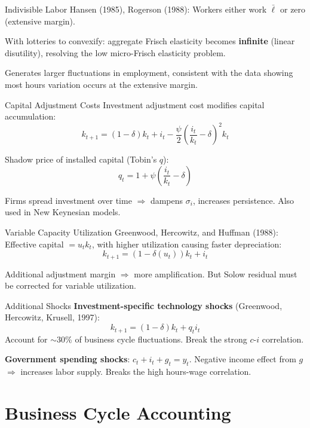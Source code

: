 \documentclass[blue]{beamer}
\begin{document}
\begin{frame}{Indivisible Labor}
	Hansen (1985), Rogerson (1988): Workers either work $\bar{\ell}$ or zero (extensive margin).
	
	\bigskip
	With lotteries to convexify: aggregate Frisch elasticity becomes \textbf{infinite} (linear disutility), resolving the low micro-Frisch elasticity problem.
	
	\bigskip
	Generates larger fluctuations in employment, consistent with the data showing most hours variation occurs at the extensive margin.
\end{frame}

\begin{frame}{Capital Adjustment Costs}
	Investment adjustment cost modifies capital accumulation:
	\[
	k_{t+1} = (1-\delta) k_t + i_t - \frac{\psi}{2}\left(\frac{i_t}{k_t} - \delta\right)^2 k_t
	\]
	
	Shadow price of installed capital (Tobin's $q$):
	\[
	q_t = 1 + \psi\left(\frac{i_t}{k_t} - \delta\right)
	\]
	
	Firms spread investment over time $\Rightarrow$ dampens $\sigma_i$, increases persistence. Also used in New Keynesian models.
\end{frame}

\begin{frame}{Variable Capacity Utilization}
	Greenwood, Hercowitz, and Huffman (1988): Effective capital $= u_t k_t$, with higher utilization causing faster depreciation:
	\[
	k_{t+1} = (1-\delta(u_t)) k_t + i_t
	\]
	
	Additional adjustment margin $\Rightarrow$ more amplification. But Solow residual must be corrected for variable utilization.
\end{frame}

\begin{frame}{Additional Shocks}
	\textbf{Investment-specific technology shocks} (Greenwood, Hercowitz, Krusell, 1997):
	\[
	k_{t+1} = (1-\delta) k_t + q_t i_t
	\]
	Account for $\sim$30\% of business cycle fluctuations. Break the strong $c$-$i$ correlation.
	
	\bigskip
	\textbf{Government spending shocks}: $c_t + i_t + g_t = y_t$. Negative income effect from $g$ $\Rightarrow$ increases labor supply. Breaks the high hours-wage correlation.
\end{frame}

\section{Business Cycle Accounting}
\end{document}
